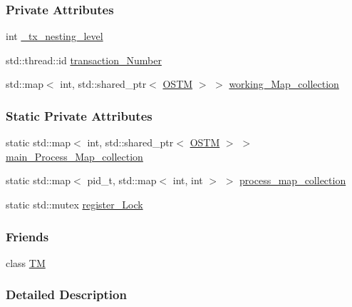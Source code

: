 \subsubsection*{Private Attributes}
\begin{DoxyCompactItemize}
\item 
int \hyperlink{class_t_x_ae8f413fd7f4fea322e7ad3c668f9898e_ae8f413fd7f4fea322e7ad3c668f9898e}{\+\_\+tx\+\_\+nesting\+\_\+level}
\item 
std\+::thread\+::id \hyperlink{class_t_x_a145a1c74b521f277fe481971a930b249_a145a1c74b521f277fe481971a930b249}{transaction\+\_\+\+Number}
\item 
std\+::map$<$ int, std\+::shared\+\_\+ptr$<$ \hyperlink{class_o_s_t_m}{O\+S\+TM} $>$ $>$ \hyperlink{class_t_x_a81aafda16e2f20e36ec6c68e584668ff_a81aafda16e2f20e36ec6c68e584668ff}{working\+\_\+\+Map\+\_\+collection}
\end{DoxyCompactItemize}
\subsubsection*{Static Private Attributes}
\begin{DoxyCompactItemize}
\item 
static std\+::map$<$ int, std\+::shared\+\_\+ptr$<$ \hyperlink{class_o_s_t_m}{O\+S\+TM} $>$ $>$ \hyperlink{class_t_x_a1a45d726894190695314464d7cd97c29_a1a45d726894190695314464d7cd97c29}{main\+\_\+\+Process\+\_\+\+Map\+\_\+collection}
\item 
static std\+::map$<$ pid\+\_\+t, std\+::map$<$ int, int $>$ $>$ \hyperlink{class_t_x_a2e3cd2f52fd93cf6ef3eb3c1cb830b9f_a2e3cd2f52fd93cf6ef3eb3c1cb830b9f}{process\+\_\+map\+\_\+collection}
\item 
static std\+::mutex \hyperlink{class_t_x_aa688a8c96fa3cdf8cd92e267463536dc_aa688a8c96fa3cdf8cd92e267463536dc}{register\+\_\+\+Lock}
\end{DoxyCompactItemize}
\subsubsection*{Friends}
\begin{DoxyCompactItemize}
\item 
class \hyperlink{class_t_x_adf1ccda799ef5c419cb43b8ae55eb45c_adf1ccda799ef5c419cb43b8ae55eb45c}{TM}
\end{DoxyCompactItemize}


\subsubsection{Detailed Description}


